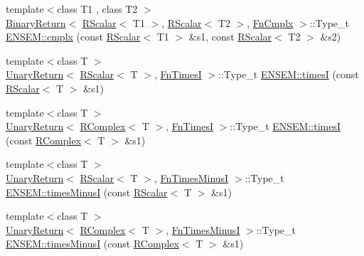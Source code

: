 \begin{DoxyCompactItemize}
\item 
{\footnotesize template$<$class T1 , class T2 $>$ }\\\mbox{\hyperlink{structENSEM_1_1BinaryReturn}{Binary\+Return}}$<$ \mbox{\hyperlink{classENSEM_1_1RScalar}{R\+Scalar}}$<$ T1 $>$, \mbox{\hyperlink{classENSEM_1_1RScalar}{R\+Scalar}}$<$ T2 $>$, \mbox{\hyperlink{structENSEM_1_1FnCmplx}{Fn\+Cmplx}} $>$\+::Type\+\_\+t \mbox{\hyperlink{group__rcomplex_gae6f982df6dd1eba378ad74676dc96bba}{E\+N\+S\+E\+M\+::cmplx}} (const \mbox{\hyperlink{classENSEM_1_1RScalar}{R\+Scalar}}$<$ T1 $>$ \&s1, const \mbox{\hyperlink{classENSEM_1_1RScalar}{R\+Scalar}}$<$ T2 $>$ \&s2)
\item 
{\footnotesize template$<$class T $>$ }\\\mbox{\hyperlink{structENSEM_1_1UnaryReturn}{Unary\+Return}}$<$ \mbox{\hyperlink{classENSEM_1_1RScalar}{R\+Scalar}}$<$ T $>$, \mbox{\hyperlink{structENSEM_1_1FnTimesI}{Fn\+TimesI}} $>$\+::Type\+\_\+t \mbox{\hyperlink{group__rcomplex_ga1741ab434937b21a3f54881161f429aa}{E\+N\+S\+E\+M\+::timesI}} (const \mbox{\hyperlink{classENSEM_1_1RScalar}{R\+Scalar}}$<$ T $>$ \&s1)
\item 
{\footnotesize template$<$class T $>$ }\\\mbox{\hyperlink{structENSEM_1_1UnaryReturn}{Unary\+Return}}$<$ \mbox{\hyperlink{classENSEM_1_1RComplex}{R\+Complex}}$<$ T $>$, \mbox{\hyperlink{structENSEM_1_1FnTimesI}{Fn\+TimesI}} $>$\+::Type\+\_\+t \mbox{\hyperlink{group__rcomplex_gaf442aefeacd8aece996f6a9d9028d72e}{E\+N\+S\+E\+M\+::timesI}} (const \mbox{\hyperlink{classENSEM_1_1RComplex}{R\+Complex}}$<$ T $>$ \&s1)
\item 
{\footnotesize template$<$class T $>$ }\\\mbox{\hyperlink{structENSEM_1_1UnaryReturn}{Unary\+Return}}$<$ \mbox{\hyperlink{classENSEM_1_1RScalar}{R\+Scalar}}$<$ T $>$, \mbox{\hyperlink{structENSEM_1_1FnTimesMinusI}{Fn\+Times\+MinusI}} $>$\+::Type\+\_\+t \mbox{\hyperlink{group__rcomplex_gaf58bc5b02a5a7fed1251f5ad0f33325a}{E\+N\+S\+E\+M\+::times\+MinusI}} (const \mbox{\hyperlink{classENSEM_1_1RScalar}{R\+Scalar}}$<$ T $>$ \&s1)
\item 
{\footnotesize template$<$class T $>$ }\\\mbox{\hyperlink{structENSEM_1_1UnaryReturn}{Unary\+Return}}$<$ \mbox{\hyperlink{classENSEM_1_1RComplex}{R\+Complex}}$<$ T $>$, \mbox{\hyperlink{structENSEM_1_1FnTimesMinusI}{Fn\+Times\+MinusI}} $>$\+::Type\+\_\+t \mbox{\hyperlink{group__rcomplex_ga630dbd8479e9fe488cbf493531594f06}{E\+N\+S\+E\+M\+::times\+MinusI}} (const \mbox{\hyperlink{classENSEM_1_1RComplex}{R\+Complex}}$<$ T $>$ \&s1)

\end{DoxyCompactItemize}
